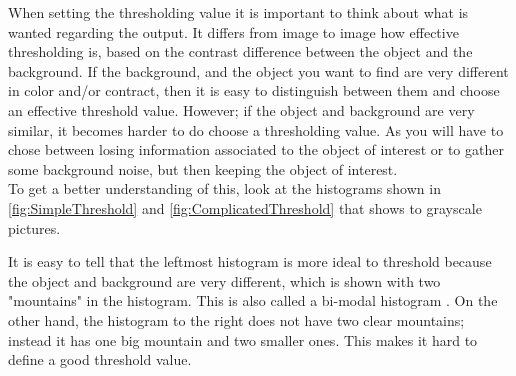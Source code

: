 When setting the thresholding value it is important to think about what is wanted regarding the output. It differs  from image to image how effective thresholding is, based on the contrast difference between the object and the background. If the background, and the object you want to find are very different in color and/or contract, then it is easy to distinguish between them and choose an effective threshold value. However; if the object and background are very similar, it becomes harder to do choose a thresholding value. As you will have to chose between losing information associated to the object of interest or to gather some background noise, but then keeping the object of interest.\\
To get a better understanding of this, look at the histograms shown in \eqref{fig:SimpleThreshold} and \eqref{fig:ComplicatedThreshold} that shows to grayscale pictures.

It is easy to tell that the leftmost histogram is more ideal to threshold because the object and background are very different, which is shown with two "mountains" in the histogram. This is also called a bi-modal histogram \citep{ip_book}. On the other hand, the histogram to the right does not have two clear mountains; instead it has one big mountain and two smaller ones. This makes it hard to define a good threshold value.

